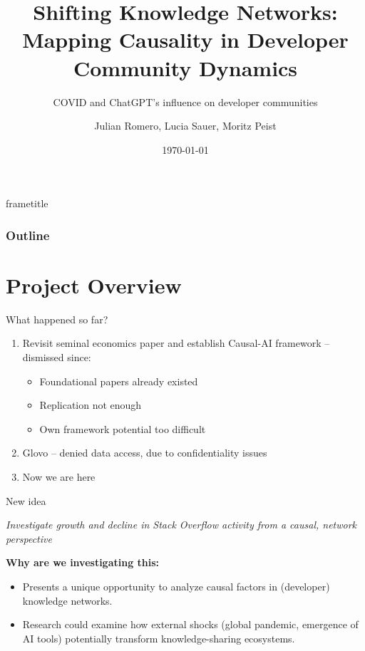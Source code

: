 \documentclass{beamer}
\title{Shifting Knowledge Networks: Mapping Causality in Developer Community Dynamics}
\subtitle{COVID and ChatGPT's influence on developer communities}
\date{\centering\today}
\author{\centering Julian Romero, Lucia Sauer, Moritz Peist}
\institute{\centering}
\begin{document}
    \begin{frame}{}
        \titlepage
    \end{frame}
    {
        \nointerlineskip
        \begin{beamercolorbox}[sep=0.3cm,wd=\paperwidth]{frametitle}
            \strut\insertframetitle\strut
            \hfill
            \raisebox{-0.8mm}{}
        \end{beamercolorbox}
    }

    \begin{frame}
        \frametitle{Outline}
        \tableofcontents
    \end{frame}

    
    \section{Project Overview}
    
    \begin{frame}{What happened so far?}
        \begin{enumerate}
            \item Revisit seminal economics paper and establish Causal-AI framework -- dismissed since:
            \begin{itemize}
                \item Foundational papers already existed
                \item Replication not enough
                \item Own framework potential too difficult
            \end{itemize}
            \item Glovo -- denied data access, due to confidentiality issues
            \item Now we are here
        \end{enumerate}
    \end{frame}
   
    \begin{frame}{New idea}
        \begin{center}
            \itshape Investigate growth and decline in Stack Overflow activity from a causal, network perspective
        \end{center}
        \textbf{Why are we investigating this:}
        \begin{itemize}
            \item Presents a unique opportunity to analyze causal factors in (developer) knowledge networks.
            \item Research could examine how external shocks (global pandemic, emergence of AI tools) potentially transform knowledge-sharing ecosystems.
        \end{itemize}
    \end{frame}
\end{document}
